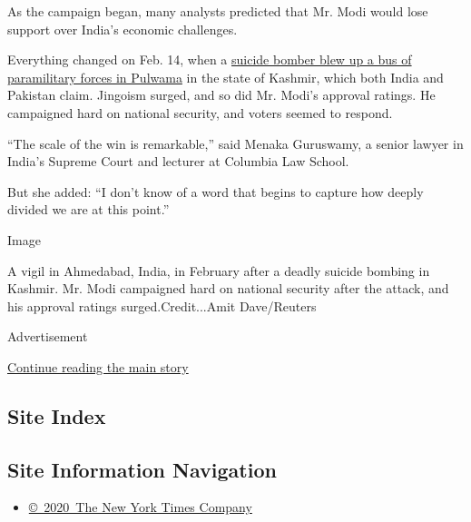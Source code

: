 As the campaign began, many analysts predicted that Mr. Modi would lose
support over India's economic challenges.

Everything changed on Feb. 14, when a
\href{https://www.nytimes.com/2019/02/14/world/asia/pulwama-attack-kashmir.html}{suicide
bomber blew up a bus of paramilitary forces in Pulwama} in the state of
Kashmir, which both India and Pakistan claim. Jingoism surged, and so
did Mr. Modi's approval ratings. He campaigned hard on national
security, and voters seemed to respond.

``The scale of the win is remarkable,'' said Menaka Guruswamy, a senior
lawyer in India's Supreme Court and lecturer at Columbia Law School.

But she added: ``I don't know of a word that begins to capture how
deeply divided we are at this point.''

Image

A vigil in Ahmedabad, India, in February after a deadly suicide bombing
in Kashmir. Mr. Modi campaigned hard on national security after the
attack, and his approval ratings surged.Credit...Amit Dave/Reuters

Advertisement

\protect\hyperlink{after-bottom}{Continue reading the main story}

\hypertarget{site-index}{%
\subsection{Site Index}\label{site-index}}

\hypertarget{site-information-navigation}{%
\subsection{Site Information
Navigation}\label{site-information-navigation}}

\begin{itemize}
\tightlist
\item
  \href{https://help.nytimes.com/hc/en-us/articles/115014792127-Copyright-notice}{©~2020~The
  New York Times Company}
\end{itemize}

